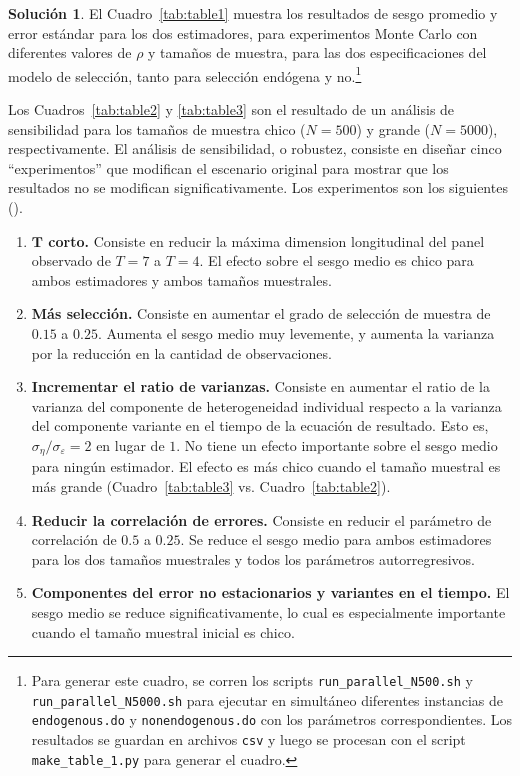 \documentclass[12pt,letterpaper,reqno,oneside]{amsart}
\theoremstyle{problemstyle} %
\theoremstyle{definition} %
\newtheorem{solution}{Solución}[problem]
\DeclareMathOperator{\ar}{AR}
\begin{document}
\begin{solution}
  El Cuadro~\ref{tab:table1} muestra los resultados de sesgo promedio y error estándar para los dos estimadores, para experimentos Monte Carlo con diferentes valores de $\rho$ y tamaños de muestra, para las dos especificaciones del modelo de selección, tanto para selección endógena y no.\footnote{Para generar este cuadro, se corren los scripts \texttt{run\_parallel\_N500.sh} y \texttt{run\_parallel\_N5000.sh} para ejecutar en simultáneo diferentes instancias de \texttt{endogenous.do} y \texttt{nonendogenous.do} con los parámetros correspondientes. Los resultados se guardan en archivos \texttt{csv} y luego se procesan con el script \texttt{make\_table\_1.py} para generar el cuadro.}

  \begin{table}[htbp]
    \centering
    \caption{Sesgo promedio en el modelo $\ar(1)$ ($T = 7$, $500$~replicaciones)}
    \label{tab:table1}
    
  \end{table}

  Los Cuadros~\ref{tab:table2} y \ref{tab:table3} son el resultado de un análisis de sensibilidad para los tamaños de muestra chico ($N = 500$) y grande ($N = 5000$), respectivamente.
  El análisis de sensibilidad, o robustez, consiste en diseñar cinco \enquote{experimentos} que modifican el escenario original para mostrar que los resultados no se modifican significativamente.
  Los experimentos son los siguientes (\cite[16,17]{al-sadoonSimpleMethodsConsistent2019}).
  \begin{enumerate}[label=\textbf{Experimento \Roman*:}, leftmargin=*, itemsep=0.5em]
    \item \textbf{$\boldsymbol{T}$ corto.} Consiste en reducir la máxima dimension longitudinal del panel observado de $T = 7$ a $T = 4$. El efecto sobre el sesgo medio es chico para ambos estimadores y ambos tamaños muestrales.
    \item \textbf{Más selección.} Consiste en aumentar el grado de selección de muestra de $0.15$ a $0.25$. Aumenta el sesgo medio muy levemente, y aumenta la varianza por la reducción en la cantidad de observaciones.
    \item \textbf{Incrementar el ratio de varianzas.} Consiste en aumentar el ratio de la varianza del componente de heterogeneidad individual respecto a la varianza del componente variante en el tiempo de la ecuación de resultado. Esto es, $\sigma_\eta/\sigma_\varepsilon = 2$ en lugar de $1$. No tiene un efecto importante sobre el sesgo medio para ningún estimador. El efecto es más chico cuando el tamaño muestral es más grande (Cuadro~\ref{tab:table3} vs. Cuadro~\ref{tab:table2}).
    \item \textbf{Reducir la correlación de errores.} Consiste en reducir el parámetro de correlación de $0.5$ a $0.25$. Se reduce el sesgo medio para ambos estimadores para los dos tamaños muestrales y todos los parámetros autorregresivos.
    \item \textbf{Componentes del error no estacionarios y variantes en el tiempo.} El sesgo medio se reduce significativamente, lo cual es especialmente importante cuando el tamaño muestral inicial es chico.
  \end{enumerate}


\end{solution}
\end{document}
